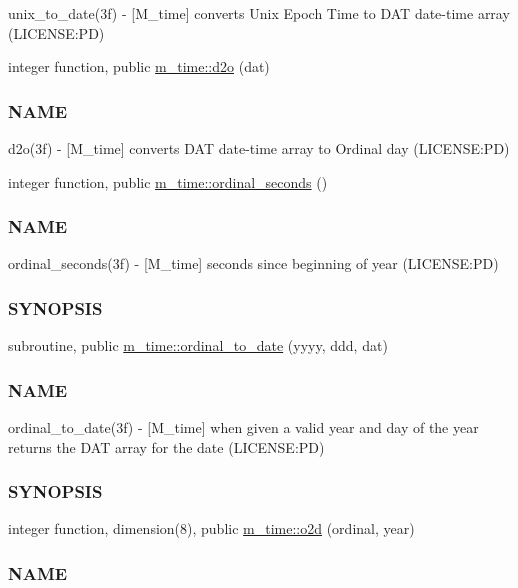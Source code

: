 \begin{DoxyCompactItemize}
\begin{DoxyCompactList}
unix\+\_\+to\+\_\+date(3f) -\/ \mbox{[}M\+\_\+time\mbox{]} converts Unix Epoch Time to D\+AT date-\/time array (L\+I\+C\+E\+N\+SE\+:PD) \end{DoxyCompactList}\item 
integer function, public \mbox{\hyperlink{namespacem__time_a727dd77bbd4a5d0e3947c5d303845947}{m\+\_\+time\+::d2o}} (dat)
\begin{DoxyCompactList}\small\item\em \subsubsection*{N\+A\+ME}

d2o(3f) -\/ \mbox{[}M\+\_\+time\mbox{]} converts D\+AT date-\/time array to Ordinal day (L\+I\+C\+E\+N\+SE\+:PD) \end{DoxyCompactList}\item 
integer function, public \mbox{\hyperlink{namespacem__time_ab8960d2aa60e134bcf77247d8b257963}{m\+\_\+time\+::ordinal\+\_\+seconds}} ()
\begin{DoxyCompactList}\small\item\em \subsubsection*{N\+A\+ME}

ordinal\+\_\+seconds(3f) -\/ \mbox{[}M\+\_\+time\mbox{]} seconds since beginning of year (L\+I\+C\+E\+N\+SE\+:PD) \subsubsection*{S\+Y\+N\+O\+P\+S\+IS}\end{DoxyCompactList}\item 
subroutine, public \mbox{\hyperlink{namespacem__time_aa4dca4409bf20a011bb04988c1335d63}{m\+\_\+time\+::ordinal\+\_\+to\+\_\+date}} (yyyy, ddd, dat)
\begin{DoxyCompactList}\small\item\em \subsubsection*{N\+A\+ME}

ordinal\+\_\+to\+\_\+date(3f) -\/ \mbox{[}M\+\_\+time\mbox{]} when given a valid year and day of the year returns the D\+AT array for the date (L\+I\+C\+E\+N\+SE\+:PD) \subsubsection*{S\+Y\+N\+O\+P\+S\+IS}\end{DoxyCompactList}\item 
integer function, dimension(8), public \mbox{\hyperlink{namespacem__time_a55e2cb9efc9d4d209ae2864f073d4f19}{m\+\_\+time\+::o2d}} (ordinal, year)
\begin{DoxyCompactList}\small\item\em \subsubsection*{N\+A\+ME}


\end{DoxyCompactList}
\end{DoxyCompactItemize}
